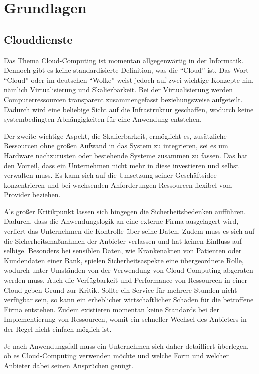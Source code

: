 \chapter{Grundlagen}

\section{Clouddienste}
Das Thema Cloud-Computing ist momentan allgegenwärtig in der Informatik.
Dennoch gibt es keine standardisierte Definition, was die "`Cloud"' ist.
Das Wort "`Cloud"' oder im deutschen "`Wolke"' weist jedoch auf zwei wichtige Konzepte hin, nämlich Virtualisierung und Skalierbarkeit\cite[vgl.][Seite 35]{hoell11}.
Bei der Virtualisierung werden Computerressourcen transparent zusammengefasst beziehungsweise aufgeteilt.
Dadurch wird eine beliebige Sicht auf die Infrastruktur geschaffen, wodurch keine systembedingten Abhängigkeiten für eine Anwendung entstehen\cite[vgl.][Seite 2]{baun10}.

Der zweite wichtige Aspekt, die Skalierbarkeit, ermöglicht es, zusätzliche Ressourcen ohne großen Aufwand in das System zu integrieren, sei es um Hardware nachzurüsten oder bestehende Systeme zusammen zu fassen.
Das hat den Vorteil, dass ein Unternehmen nicht mehr in diese investieren und selbst verwalten muss.
Es kann sich auf die Umsetzung seiner Geschäftsidee konzentrieren und bei wachsenden Anforderungen Ressourcen flexibel vom Provider beziehen\cite[vgl.][Seite 2]{baun10}.

Als großer Kritikpunkt lassen sich hingegen die Sicherheitsbedenken aufführen.
Dadurch, dass die Anwendungslogik an eine externe Firma ausgelagert wird, verliert das Unternehmen die Kontrolle über seine Daten.
Zudem muss es sich auf die Sicherheitsmaßnahmen der Anbieter verlassen und hat keinen Einfluss auf selbige.
Besonders bei sensiblen Daten, wie Krankenakten von Patienten oder Kundendaten einer Bank, spielen Sicherheitsaspekte eine übergeordnete Rolle, wodurch unter Umständen von der Verwendung von Cloud-Computing abgeraten werden muss.
Auch die Verfügbarkeit und Performance von Ressourcen in einer Cloud geben Grund zur Kritik.
Sollte ein Service für mehrere Stunden nicht verfügbar sein, so kann ein erheblicher wirtschaftlicher Schaden für die betroffene Firma entstehen.
Zudem existieren momentan keine Standards bei der Implementierung von Ressourcen, womit ein schneller Wechsel des Anbieters in der Regel nicht einfach möglich ist\cite[vgl.][Seite 3]{baun10}.

Je nach Anwendungsfall muss ein Unternehmen sich daher detailliert überlegen, ob es Cloud-Computing verwenden möchte und welche Form und welcher Anbieter dabei seinen Ansprüchen genügt.

